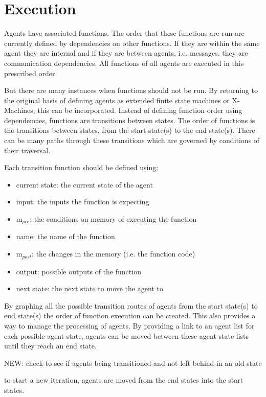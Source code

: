 \section{Execution}

Agents have associated functions. The order that these functions are run are
currently defined by dependencies on other functions. If they are within the same
agent they are internal and if they are between agents, i.e. messages, they are
communication dependencies. All functions of all agents are executed in this
prescribed order.

But there are many instances when functions should not be run. By returning to
the original basis of defining agents as extended finite state machines or
X-Machines, this can be incorporated. Instead of defining function order using
dependencies, functions are transitions between states. The order of functions is
the transitions between states, from the start state(s) to the end state(s).
There can be many paths through these transitions which are governed by
conditions of their traversal.

Each transition function should be defined using:

\begin{itemize}
\item current state: the current state of the agent
\item input: the inputs the function is expecting
\item m$_{pre}$: the conditions on memory of executing the function
\item name: the name of the function
\item m$_{post}$: the changes in the memory (i.e. the function code)
\item output: possible outputs of the function
\item next state: the next state to move the agent to
\end{itemize}

By graphing all the possible transition routes of agents from the start state(s)
to end state(s) the order of function execution can be created. This also
provides a way to manage the processing of agents. By providing a link to an
agent list for each possible agent state, agents can be moved between these agent
state lists until they reach an end state.

NEW: check to see if agents being transitioned and not left behind in an old
state

to start a new iteration, agents are moved from the end states into the start
states.
